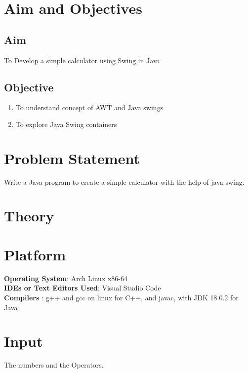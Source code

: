\documentclass[11pt]{article}
\begin{document}
\tableofcontents
\thispagestyle{empty}
\clearpage


\setcounter{page}{1}

\section{Aim and Objectives}
\subsection*{Aim}
To Develop a simple calculator using Swing in Java
\subsection*{Objective}
\begin{enumerate}
	\item To understand concept of AWT and Java swings
	\item To explore Java Swing containers
\end{enumerate}
\section{Problem Statement}
Write a Java program to create a simple calculator with the help of java swing.

\section{Theory}
\section{Platform}
\textbf{Operating System}: Arch Linux x86-64 \\
\textbf{IDEs or Text Editors Used}: Visual Studio Code\\
\textbf{Compilers} : g++ and gcc on linux for C++, and javac, with JDK 18.0.2 for Java\\

\section{Input}
The numbers and the Operators.
\end{document}
